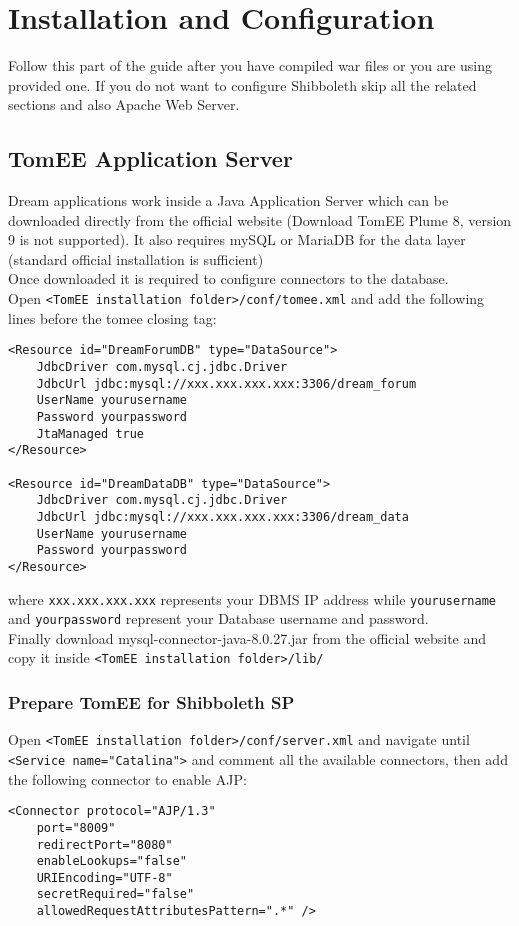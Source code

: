 \section{Installation and Configuration}
Follow this part of the guide after you have compiled war files or you are using provided one.
If you do not want to configure Shibboleth skip all the related sections and also Apache Web Server.

\subsection{TomEE Application Server}
Dream applications work inside a Java Application Server which can be downloaded directly from the official website (Download TomEE Plume 8, version 9 is not supported). It also requires mySQL or MariaDB for the data layer (standard official installation is sufficient)\\
Once downloaded it is required to configure connectors to the database.\\
Open \texttt{<TomEE installation folder>/conf/tomee.xml} and add the following lines before the tomee closing tag:
\begin{verbatim}
<Resource id="DreamForumDB" type="DataSource">
    JdbcDriver com.mysql.cj.jdbc.Driver
    JdbcUrl jdbc:mysql://xxx.xxx.xxx.xxx:3306/dream_forum
    UserName yourusername
    Password yourpassword
    JtaManaged true
</Resource>
  
<Resource id="DreamDataDB" type="DataSource">
    JdbcDriver com.mysql.cj.jdbc.Driver
    JdbcUrl jdbc:mysql://xxx.xxx.xxx.xxx:3306/dream_data
    UserName yourusername
    Password yourpassword
</Resource>
\end{verbatim}
where \texttt{xxx.xxx.xxx.xxx} represents your DBMS IP address while \texttt{yourusername} and \texttt{yourpassword} represent your Database username and password.\\
Finally download mysql-connector-java-8.0.27.jar from the official website and copy it inside \texttt{<TomEE installation folder>/lib/}

\subsubsection*{Prepare TomEE for Shibboleth SP}
Open \texttt{<TomEE installation folder>/conf/server.xml} and navigate until \texttt{<Service name="Catalina">} and comment all the available connectors, then add the following connector to enable AJP:
\begin{verbatim}
<Connector protocol="AJP/1.3"
    port="8009"
    redirectPort="8080"
    enableLookups="false"
    URIEncoding="UTF-8"
    secretRequired="false"
    allowedRequestAttributesPattern=".*" />
\end{verbatim}

